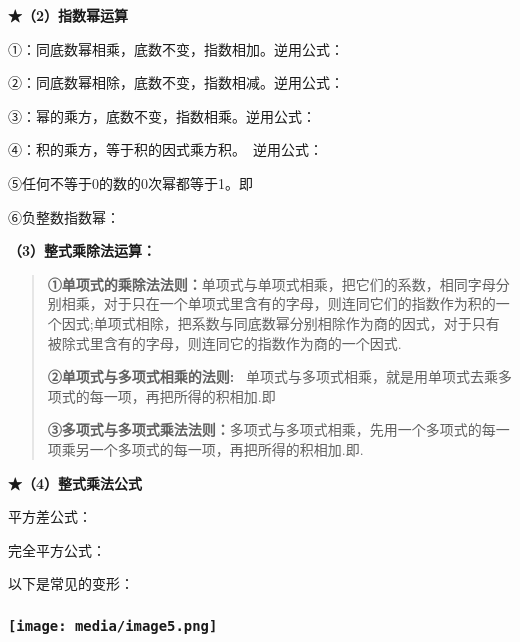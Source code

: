 \documentclass[a4paper,11pt,UTF8]{ctexart}
\begin{document}
\textbf{★（2）指数幂运算}

①：同底数幂相乘，底数不变，指数相加。逆用公式：~

②：同底数幂相除，底数不变，指数相减。逆用公式：

③：幂的乘方，底数不变，指数相乘。逆用公式：

④：积的乘方，等于积的因式乘方积。~逆用公式：

⑤任何不等于0的数的0次幂都等于1。即

⑥负整数指数幂：

\textbf{（3）整式乘除法运算：}

\begin{quote}
\textbf{①单项式的乘除法法则：}单项式与单项式相乘，把它们的系数，相同字母分别相乘，对于只在一个单项式里含有的字母，则连同它们的指数作为积的一个因式;单项式相除，把系数与同底数幂分别相除作为商的因式，对于只有被除式里含有的字母，则连同它的指数作为商的一个因式.

\textbf{②单项式与多项式相乘的法则:}
~单项式与多项式相乘，就是用单项式去乘多项式的每一项，再把所得的积相加.即

\textbf{③多项式与多项式乘法法则：}多项式与多项式相乘，先用一个多项式的每一项乘另一个多项式的每一项，再把所得的积相加.即.
\end{quote}

\textbf{★（4）整式乘法公式 ~}

平方差公式： ~

完全平方公式：

以下是常见的变形： ~

\hypertarget{ux5b66ux79d1ux7f51www.zxxk.com--ux6559ux80b2ux8d44ux6e90ux95e8ux6237ux63d0ux4f9bux8bd5ux9898ux8bd5ux5377ux6559ux6848ux8bfeux4ef6ux6559ux5b66ux8bbaux6587ux7d20ux6750ux7b49ux5404ux7c7bux6559ux5b66ux8d44ux6e90ux5e93ux4e0bux8f7dux8fd8ux6709ux5927ux91cfux4e30ux5bccux7684ux6559ux5b66ux8d44ux8baf-3}{%
\subsubsection{\texorpdfstring{\protect\texttt{[image: media/image5.png]}}{学科网(www.zxxk.com)-\/-教育资源门户，提供试题试卷、教案、课件、教学论文、素材等各类教学资源库下载，还有大量丰富的教学资讯！}}\label{ux5b66ux79d1ux7f51www.zxxk.com--ux6559ux80b2ux8d44ux6e90ux95e8ux6237ux63d0ux4f9bux8bd5ux9898ux8bd5ux5377ux6559ux6848ux8bfeux4ef6ux6559ux5b66ux8bbaux6587ux7d20ux6750ux7b49ux5404ux7c7bux6559ux5b66ux8d44ux6e90ux5e93ux4e0bux8f7dux8fd8ux6709ux5927ux91cfux4e30ux5bccux7684ux6559ux5b66ux8d44ux8baf-3}}
\end{document}
